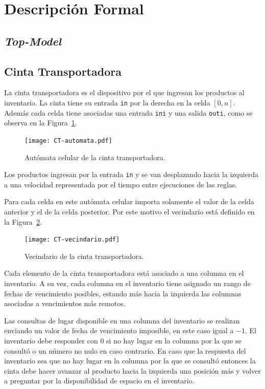 \documentclass[10pt]{article}
\begin{document}
\section{Descripción Formal}

\subsection{\textit{Top-Model}}

\subsection{Cinta Transportadora}\label{sec:CT}

La cinta transportadora es el dispositivo por el que ingresan los productos al inventario. La cinta tiene su entrada \texttt{in} por la derecha en la celda $[0,n]$. Además cada celda tiene asociadas una entrada \texttt{ini} y una salida \texttt{outi}, como se observa en la Figura~\ref{fig:CT-automata}. 

\begin{figure}[h] 
  \centering 
  \texttt{[image: CT-automata.pdf]} 
  \caption{Autómata celular de la cinta transportadora.} 
  \label{fig:CT-automata} 
\end{figure}
\FloatBarrier


Los productos ingresan por la entrada \texttt{in} y se van desplazando hacia la izquierda a una velocidad representada por el tiempo entre ejecuciones de las reglas.

Para cada celda en este autómata celular importa solamente el valor de la celda anterior y el de la celda posterior. Por este motivo el vecindario está definido en la Figura~\ref{fig:CT-vecindario}.

\begin{figure}[h] 
  \centering 
  \texttt{[image: CT-vecindario.pdf]} 
  \caption{Vecindario de la cinta transportadora.} 
  \label{fig:CT-vecindario} 
\end{figure}
\FloatBarrier

Cada elemento de la cinta transportadora está asociado a una columna en el inventario. A su vez, cada columna en el inventario tiene asignado un rango de fechas de vencimiento posibles, estando más hacia la izquierda las columnas asociadas a vencimientos más remotos.

Las consultas de lugar disponible en una columna del inventario se realizan enviando un valor de fecha de vencimiento imposible, en este caso igual a $-1$. El inventario debe responder con $0$ si no hay lugar en la columna por la que se consultó o un número no nulo en caso contrario. En caso que la respuesta del inventario sea que no hay lugar en la columna por la que se consultó entonces la cinta debe hacer avanzar al producto hacia la izquierda una posición más y volver a preguntar por la disponibilidad de espacio en el inventario.
\end{document}
